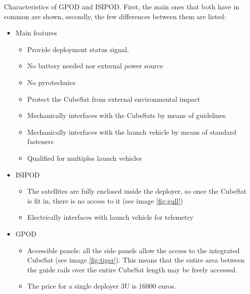 Characteristics of GPOD and ISIPOD. First, the main ones that both have in common are shown, secondly, the few differences between them are listed:
\begin{itemize}
\item Main features
\begin{itemize}
\item Provide deployment status signal.
\item No battery needed nor external power source
\item No pyrotechnics
\item Protect the CubeSat from external environmental impact
\item Mechanically interfaces with the CubeSats by means of guidelines
\item Mechanically interfaces with the launch vehicle by means of standard fasteners
\item Qualified for multiples launch vehicles
\end{itemize}
\item ISIPOD 
\begin{itemize}
\item The satellites are fully enclosed inside the deployer, so once the CubeSat is fit in, there is no access to it (see image \ref{fig:gull})
\item Electrically interfaces with launch vehicle for telemetry
\end{itemize}
\item GPOD
\begin{itemize}
\item Accessible panels: all the side panels allow the access to the integrated CubeSat (see image \ref{fig:tiger}). This means that the entire area between the guide rails over the entire CubeSat length may be freely accessed. 
\item The price for a single deployer 3U is 16000 euros. 
\end{itemize}
\end{itemize}

